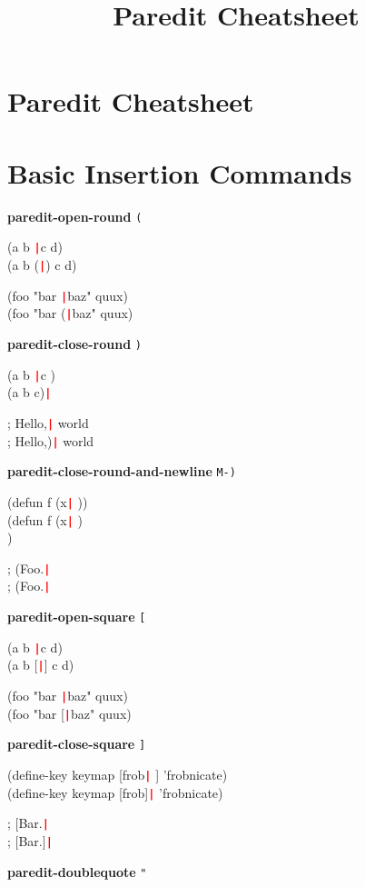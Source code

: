 \documentclass[10pt,landscape,a4paper]{article}
\title{Paredit Cheatsheet}
\begin{document}
  \newcommand{\cursor}{\texttt{\textcolor{red}{\textbf{|}}}}

  \begin{multicols}{4}

    \section*{\Large{Paredit Cheatsheet}}

    \section*{\large{Basic Insertion Commands}}

\textbf{paredit-open-round} \texttt{(}

{\ttfamily
(a b \cursor c d)\\
(a b (\cursor) c d)

(foo "bar \cursor baz" quux)\\
(foo "bar (\cursor baz" quux)
}

\textbf{paredit-close-round} \texttt{)}

{\ttfamily
(a b \cursor c \space\space)\\
(a b c)\cursor

; Hello,\cursor{} world\\
; Hello,)\cursor{} world
}

\textbf{paredit-close-round-and-newline} \texttt{M-)}

{\ttfamily
(defun f (x\cursor{} \space))\\
(defun f (x\cursor{} \space)\\
)

; (Foo.\cursor\\
; (Foo.\cursor
}

\textbf{paredit-open-square} \texttt{[}

{\ttfamily
(a b \cursor c d)\\
(a b [\cursor] c d)

(foo "bar \cursor baz" quux)\\
(foo "bar [\cursor baz" quux)
}

\textbf{paredit-close-square} \texttt{]}

{\ttfamily
(define-key keymap [frob\cursor{} \space] 'frobnicate)\\
(define-key keymap [frob]\cursor{} 'frobnicate)

; [Bar.\cursor\\
; [Bar.]\cursor
}

\textbf{paredit-doublequote} \texttt{"}


\end{multicols}
\end{document}
